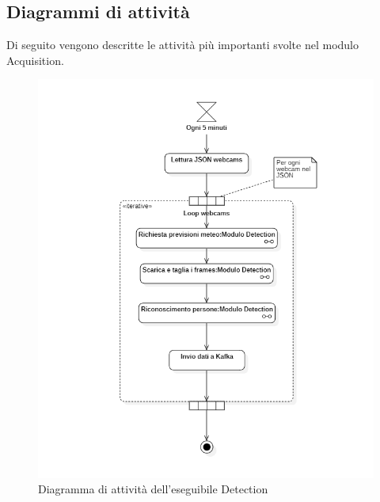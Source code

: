 \subsection{Diagrammi di attività}\label{ArchitetturaDelProdottoArchitetturaModuloAcquisitionDiagrammiDIAttività}
Di seguito vengono descritte le attività più importanti svolte nel modulo Acquisition.
\begin{figure}[H]
  \begin{center}
    \includegraphics[scale=0.8]{../immagini/diag_PB/detection.png}
    \caption{Diagramma di attività dell'eseguibile Detection}
  \end{center}
\end{figure}


